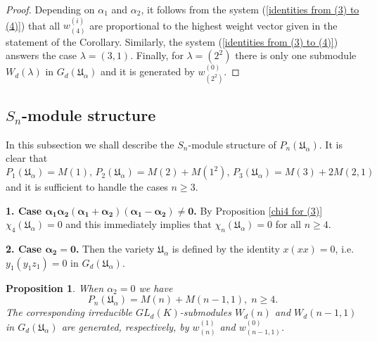 \documentclass{amsart}
\newtheorem{proposition}[theorem]{Proposition}
\theoremstyle{definition}
\begin{document}
\begin{proof}
Depending on $\alpha_1$ and $\alpha_2$, it follows from the system (\ref{identities from (3) to (4)}) that all $w_{(4)}^{(i)}$ are proportional
to the highest weight vector given in the statement of the Corollary.
Similarly, the system (\ref{identities from (3) to (4)}) answers the case $\lambda=(3,1)$.
Finally, for $\lambda=(2^2)$ there is only one submodule $W_d(\lambda)$ in $G_d({\mathfrak U}_{\alpha})$ and it is generated by $w_{(2^2)}^{(0)}$.
\end{proof}

\subsection{$S_n$-module structure}
In this subsection we shall describe the $S_n$-module structure of $P_n({\mathfrak U}_{\alpha})$.
It is clear that
\[
P_1({\mathfrak U}_{\alpha})=M(1),\,P_2({\mathfrak U}_{\alpha})=M(2)+M(1^2),\,P_3({\mathfrak U}_{\alpha})=M(3)+2M(2,1)
\]
and it is sufficient to handle the cases $n\geq 3$.

{\bf 1. Case $\bm{\alpha_1\alpha_2(\alpha_1+\alpha_2)(\alpha_1-\alpha_2)\not=0}$.}
By Proposition \ref{chi4 for (3)} $\chi_4({\mathfrak U}_{\alpha})=0$ and this immediately implies that $\chi_n({\mathfrak U}_{\alpha})=0$ for all $n\geq 4$.

{\bf 2. Case $\bm{\alpha_2=0}$.} Then the variety ${\mathfrak U}_{\alpha}$ is defined by the identity $x(xx)=0$, i.e. $y_1(y_1z_1)=0$ in $G_d({\mathfrak U}_{\alpha})$.

\begin{proposition}\label{chi for alpha2=0}
When $\alpha_2=0$ we have
\[
P_n({\mathfrak U}_{\alpha})=M(n)+M(n-1,1),\; n\geq 4.
\]
The corresponding irreducible $GL_d(K)$-submodules $W_d(n)$ and $W_d(n-1,1)$ in $G_d({\mathfrak U}_{\alpha})$ are generated, respectively, by
$w_{(n)}^{(1)}$ and $w_{(n-1,1)}^{(0)}$.
\end{proposition}
\end{document}
